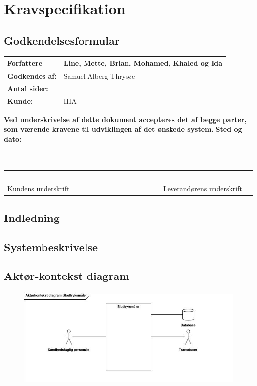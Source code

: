 
\chapter{Kravspecifikation}
\section{Godkendelsesformular}
\begin{table}[h!]
\label{tab:tabel2}
\begin{tabular}{| l | >{\raggedright\arraybackslash}p{12cm} |}
   \hline
   \textbf{Forfattere} & Line, Mette, Brian, Mohamed, Khaled og Ida\\ \hline
   \textbf{Godkendes af:} & Samuel Alberg Thrysøe\\ \hline
   \textbf{Antal sider:} & \\ \hline
   \textbf{Kunde:} & IHA\\ \hline
\end{tabular}
\end{table}
\textbf{Ved underskrivelse af dette dokument accepteres det af begge parter, som værende kravene til udviklingen af det ønskede system.}
\newline
\textbf{Sted og dato:}\\
\\
\\
\begin{table}
[h!]
\begin{tabular}{ l lllllllll l}
--------------------------------------&&&&&&&&&&--------------------------------------\\ 
Kundens underskrift &&&&&&&&&&Leverandørens underskrift\\
\end{tabular}
\end{table}
\section{Indledning}

\newpage

\section{Systembeskrivelse}

\newpage

\section{Aktør-kontekst diagram}
\begin{figure}[h!]
\includegraphics[width =1.0\textwidth , right]{billeder/Aktorkontekst.jpg}
\end{figure}


